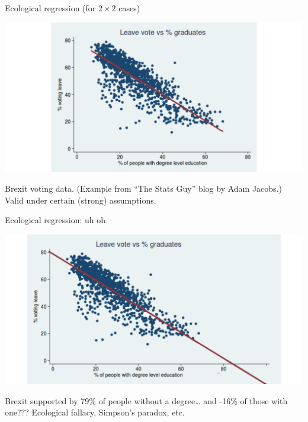 \documentclass[
  ignorenonframetext,
]{beamer}
\begin{document}
\begin{frame}{Ecological regression (for \(2\times 2\) cases)}
\protect\hypertarget{ecological-regression-for-2times-2-cases}{}

\includegraphics{defense_files/figure-beamer/unnamed-chunk-22-1.pdf}

Brexit voting data. (Example from ``The Stats Guy'' blog by Adam
Jacobs.) Valid under certain (strong) assumptions.

\end{frame}

\begin{frame}{Ecological regression: uh oh}
\protect\hypertarget{ecological-regression-uh-oh}{}

\includegraphics{defense_files/figure-beamer/unnamed-chunk-23-1.pdf}

Brexit supported by 79\% of people without a degree\ldots{} and -16\% of
those with one??? Ecological fallacy, Simpson's paradox, etc.

\end{frame}
\end{document}
